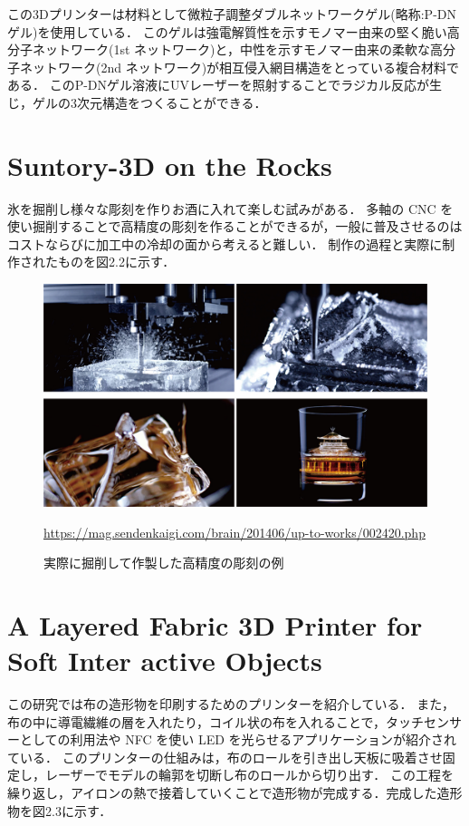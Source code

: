 この3Dプリンターは材料として微粒子調整ダブルネットワークゲル(略称:P-DNゲル)を使用している．
このゲルは強電解質性を示すモノマー由来の堅く脆い高分子ネットワーク(1st ネットワーク)と，中性を示すモノマー由来の柔軟な高分子ネットワーク(2nd ネットワーク)が相互侵入網目構造をとっている複合材料である．
このP-DNゲル溶液にUVレーザーを照射することでラジカル反応が生じ，ゲルの3次元構造をつくることができる．

\section{Suntory-3D on the Rocks\cite{b}}
\label{sec:enum}

氷を掘削し様々な彫刻を作りお酒に入れて楽しむ試みがある．
多軸の CNC を使い掘削することで高精度の彫刻を作ることができるが，一般に普及させるのはコストならびに加工中の冷却の面から考えると難しい．
制作の過程と実際に制作されたものを図2.2に示す．

\begin{figure}[H]
  \centering
  \includegraphics[width=12truecm]{./fig/Suntory.jpg}
  \caption{実際に掘削して作製した高精度の彫刻の例}
  \url{https://mag.sendenkaigi.com/brain/201406/up-to-works/002420.php} %
  \label{fig:Suntory}
\end{figure}


\section{A Layered Fabric 3D Printer for Soft Inter active Objects\cite{c}}
\label{sec:enum}
この研究では布の造形物を印刷するためのプリンターを紹介している．
また，布の中に導電繊維の層を入れたり，コイル状の布を入れることで，タッチセンサーとしての利用法や NFC を使い LED を光らせるアプリケーションが紹介されている．
このプリンターの仕組みは，布のロールを引き出し天板に吸着させ固定し，レーザーでモデルの輪郭を切断し布のロールから切り出す．
この工程を繰り返し，アイロンの熱で接着していくことで造形物が完成する．完成した造形物を図2.3に示す．

